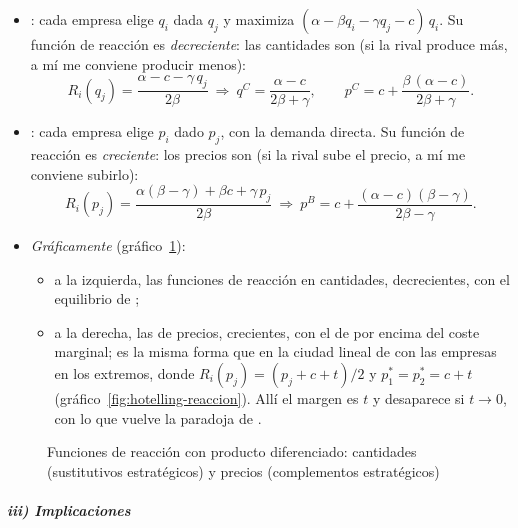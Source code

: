 \documentclass[11pt]{article}
\begin{document}
\begin{itemize}
\item \emph{}: cada empresa elige $q_i$ dada $q_j$ y maximiza $(\alpha-\beta q_i-\gamma q_j-c)\,q_i$. Su función de reacción es \emph{decreciente}: las cantidades son  (si la rival produce más, a mí me conviene producir menos):
  $$R_i(q_j)=\frac{\alpha-c-\gamma\,q_j}{2\beta}\ \Longrightarrow\ q^C=\frac{\alpha-c}{2\beta+\gamma},\qquad p^C=c+\frac{\beta\,(\alpha-c)}{2\beta+\gamma}.$$
\item \emph{}: cada empresa elige $p_i$ dado $p_j$, con la demanda directa. Su función de reacción es \emph{creciente}: los precios son  (si la rival sube el precio, a mí me conviene subirlo)\nocite{BulowGeanakoplosKlemperer1985Multimarket}:
  $$R_i(p_j)=\frac{\alpha(\beta-\gamma)+\beta c+\gamma\,p_j}{2\beta}\ \Longrightarrow\ p^B=c+\frac{(\alpha-c)(\beta-\gamma)}{2\beta-\gamma}.$$
\item \emph{Gráficamente} (gráfico~\ref{fig:reaccion-diferenciado}):
  \begin{itemize}
  \item a la izquierda, las funciones de reacción en cantidades, decrecientes, con el equilibrio de ;
  \item a la derecha, las de precios, crecientes, con el de  por encima del coste marginal; es la misma forma que en la ciudad lineal de  con las empresas en los extremos, donde $R_i(p_j)=(p_j+c+t)/2$ y $p_1^*=p_2^*=c+t$ (gráfico~\ref{fig:hotelling-reaccion}). Allí el margen es $t$ y desaparece si $t\to0$, con lo que vuelve la paradoja de .
  \end{itemize}
\end{itemize}

\begin{figure}[H]
\centering
\caption{Funciones de reacción con producto diferenciado: cantidades (sustitutivos estratégicos) y precios (complementos estratégicos)}\label{fig:reaccion-diferenciado}
\end{figure}

\subparagraph{iii) Implicaciones}
\end{document}
